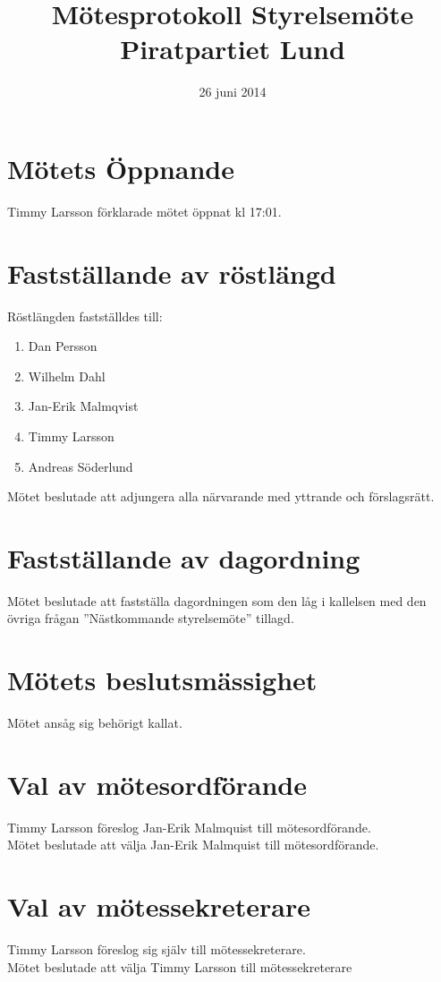 \documentclass[a4paper,10pt]{article}
\title{\vspace{-1.5in}\textmd{\textbf{Mötesprotokoll Styrelsemöte Piratpartiet Lund}}}
\date{26 juni 2014}
\author{}
\begin{document}
\maketitle

\section{Mötets Öppnande}
Timmy Larsson förklarade mötet öppnat kl 17:01.

\section{Fastställande av röstlängd}
Röstlängden fastställdes till:
\begin{enumerate}
\item Dan Persson
\item Wilhelm Dahl
\item Jan-Erik Malmqvist
\item Timmy Larsson
\item Andreas Söderlund
\end{enumerate}
Mötet beslutade att adjungera alla närvarande med yttrande och förslagsrätt.

\section{Fastställande av dagordning}
Mötet beslutade att fastställa dagordningen som den låg i kallelsen med den övriga frågan ''Nästkommande styrelsemöte'' tillagd.

\section{Mötets beslutsmässighet}
Mötet ansåg sig behörigt kallat.

\newpage

\section{Val av mötesordförande}
Timmy Larsson föreslog Jan-Erik Malmquist till mötesordförande.\\
Mötet beslutade att välja Jan-Erik Malmquist till mötesordförande.

\section{Val av mötessekreterare}
Timmy Larsson föreslog sig själv till mötessekreterare.\\
Mötet beslutade att välja Timmy Larsson till mötessekreterare
\end{document}
